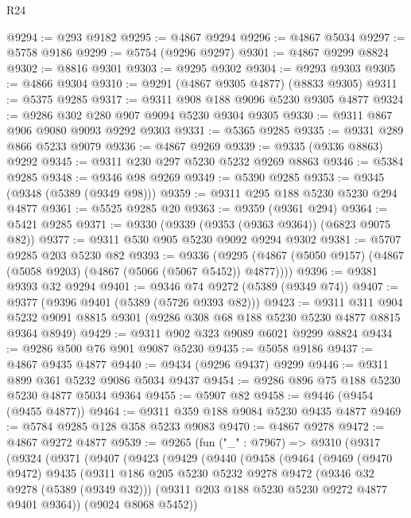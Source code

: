 \begin{lexlean}{R24}
\begin{coremodule}
@9294 := @293 @9182
@9295 := @4867 @9294
@9296 := @4867 @5034
@9297 := @5758 @9186
@9299 := @5754 (@9296 @9297)
@9301 := @4867 @9299 @8824
@9302 := @8816 @9301
@9303 := @9295 @9302
@9304 := @9293 @9303
@9305 := @4866 @9304
@9310 := @9291 (@4867 @9305 @4877) (@8833 @9305)
@9311 := @5375 @9285
@9317 := @9311 @908 @188 @9096 @5230 @9305 @4877
@9324 := @9286 @302 @280 @907 @9094 @5230 @9304 @9305
@9330 := @9311 @867 @906 @9080 @9093 @9292 @9303
@9331 := @5365 @9285
@9335 := @9331 @289 @866 @5233 @9079
@9336 := @4867 @9269
@9339 := @9335 (@9336 @8863) @9292
@9345 := @9311 @230 @297 @5230 @5232 @9269 @8863
@9346 := @5384 @9285
@9348 := @9346 @98 @9269
@9349 := @5390 @9285
@9353 := @9345 (@9348 (@5389 (@9349 @98)))
@9359 := @9311 @295 @188 @5230 @5230 @294 @4877
@9361 := @5525 @9285 @20
@9363 := @9359 (@9361 @294)
@9364 := @5421 @9285
@9371 := @9330 (@9339 (@9353 (@9363 @9364)) (@6823 @9075 @82))
@9377 := @9311 @530 @905 @5230 @9092 @9294 @9302
@9381 := @5707 @9285 @203 @5230 @82
@9393 := @9336
    (@9295 (@4867 (@5050 @9157) (@4867 (@5058 @9203) (@4867 (@5066 (@5067 @5452)) @4877))))
@9396 := @9381 @9393 @32 @9294
@9401 := @9346 @74 @9272 (@5389 (@9349 @74))
@9407 := @9377 (@9396 @9401 (@5389 (@5726 @9393 @82)))
@9423 := @9311
    @311
    @904
    @5232
    @9091
    @8815
    @9301
    (@9286 @308 @68 @188 @5230 @5230 @4877 @8815 @9364 @8949)
@9429 := @9311 @902 @323 @9089 @6021 @9299 @8824
@9434 := @9286 @500 @76 @901 @9087 @5230
@9435 := @5058 @9186
@9437 := @4867 @9435 @4877
@9440 := @9434 (@9296 @9437) @9299
@9446 := @9311 @899 @361 @5232 @9086 @5034 @9437
@9454 := @9286 @896 @75 @188 @5230 @5230 @4877 @5034 @9364
@9455 := @5907 @82
@9458 := @9446 (@9454 (@9455 @4877))
@9464 := @9311 @359 @188 @9084 @5230 @9435 @4877
@9469 := @5784 @9285 @128 @358 @5233 @9083
@9470 := @4867 @9278
@9472 := @4867 @9272 @4877
@9539 := @9265
    (fun ("_" : @7967) =>
    @9310
      (@9317
        (@9324
          (@9371
            (@9407
              (@9423
                (@9429
                  (@9440
                    (@9458
                      (@9464
                        (@9469
                          (@9470 @9472)
                          @9435
                          (@9311
                            @186
                            @205
                            @5230
                            @5232
                            @9278
                            @9472
                            (@9346 @32 @9278 (@5389 (@9349 @32)))
                            (@9311 @203 @188 @5230 @5230 @9272 @4877 @9401 @9364))
                          (@9024 @8068 @5452))

\end{coremodule}
\end{lexlean}
